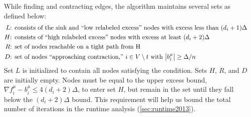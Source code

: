 \documentclass[11pt]{article}
\theoremstyle{definition}
\theoremstyle{definition}
\theoremstyle{definition}
\newcommand{\fu}{f^{\mu}}
\newcommand{\nfiu}{\nabla \fu_i}
\newcommand{\biu}{b_{i}^{\mu}}
\begin{document}
While finding and contracting edges, the algorithm maintains several sets as defined below:
	\begin{align*}
	L&\text{: consists of the sink and ``low relabeled excess'' nodes with excess less than } (d_i +1)\Delta \\
	H&\text{: consists of ``high relabeled excess'' nodes with  excess at least } (d_i + 2)\Delta \\
	R&\text{: set of nodes reachable on a tight path from H } \\ 
	D&\text{: set of nodes ``approaching contraction,'' $i \in V \setminus t$ with } \abs{b_i^\mu} \geq \Delta / n
	\end{align*}
Set $L$ is initialized to contain all nodes satisfying the condition. Sets $H$,
$R$, and $D$ are initially empty. Nodes must be equal to the upper excess bound, 
$\nfiu - \biu \leq 4(d_i + 2)\Delta$, to enter set $H$, but remain in the set until they
fall below the $(d_i + 2)\Delta$ bound. This requirement will help us bound the total number of iterations in the runtime analysis (\ref{sec:runtime2013}).
\end{document}
